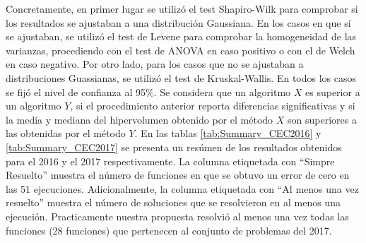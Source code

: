 %
Concretamente, en primer lugar se utilizó el test Shapiro-Wilk para comprobar si los resultados se ajustaban a una distribución Gaussiana. 
%
En los casos en que sí se ajustaban, se utilizó el test de Levene para comprobar la homogeneidad de las varianzas, procediendo con el test de ANOVA en caso positivo o con el de Welch en caso negativo.
%
Por otro lado, para los casos que no se ajustaban a distribuciones Guassianas, se utilizó el test de Kruskal-Wallis.
%
En todos los casos se fijó el nivel de confianza al 95\%.
%
Se considera que un algoritmo $X$ es superior a un algoritmo $Y$, si el procedimiento anterior reporta diferencias significativas y si la media y mediana del hipervolumen obtenido por el método $X$ son superiores a las obtenidas por el método $Y$.
%
En las tablas \ref{tab:Summary_CEC2016} y \ref{tab:Summary_CEC2017} se presenta un resúmen de los resultados obtenidos para el \CEC{} 2016 y el \CEC{} 2017 respectivamente.
%
La columna etiquetada con ``Simpre Resuelto'' muestra el número de funciones en que se obtuvo un error de cero en las 51 ejecuciones.
%
Adicionalmente, la columna etiquetada con ``Al menos una vez resuelto'' muestra el número de soluciones que se resolvieron en al menos una ejecución.
%
Practicamente nuestra propuesta resolvió al menos una vez todas las funciones (28 funciones) que pertenecen al conjunto de problemas del \CEC{} 2017.
